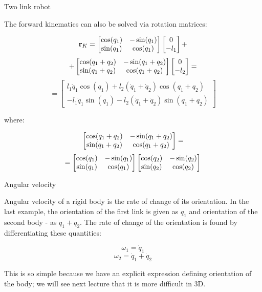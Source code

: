 \documentclass{beamer}
\begin{document}
\begin{frame}{Two link robot}
	\begin{flushleft}
		
		The forward kinematics can also be solved via rotation matrices:
		
		$$
			\mathbf{r}_K = 
			\begin{bmatrix} \cos(q_1) & -\sin (q_1) \\ \sin (q_1) & \cos(q_1) \end{bmatrix}
			\begin{bmatrix}
				0 \\ 
				-l_1 
			\end{bmatrix}
		+$$
		$$+
		\begin{bmatrix} \cos(q_1+q_2) & -\sin (q_1+q_2) \\ \sin (q_1+q_2) & \cos(q_1+q_2) \end{bmatrix}
		\begin{bmatrix}
			0 \\ 
			-l_2 
		\end{bmatrix}
			=$$
			$$
			=
			\begin{bmatrix}
				l_1 \dot q_1\cos (q_1) + l_2 (\dot q_1+\dot q_2) \cos (q_1+q_2) \\ 
				- l_1 \dot q_1\sin (q_1)  - l_2 (\dot q_1+\dot q_2) \sin (q_1+q_2) 
			\end{bmatrix}
		$$
		
		where:
		
		$$ \begin{bmatrix} \cos(q_1+q_2) & -\sin (q_1+q_2) \\ \sin (q_1+q_2) & \cos(q_1+q_2) \end{bmatrix}  =$$
		$$=
		\begin{bmatrix} \cos(q_1) & -\sin (q_1) \\ \sin (q_1) & \cos(q_1) \end{bmatrix}
		\begin{bmatrix} \cos(q_2) & -\sin (q_2) \\ \sin (q_2) & \cos(q_2) \end{bmatrix}
		$$ 
		
		
		
		
		
	\end{flushleft}
\end{frame}



\begin{frame}{Angular velocity}
	\begin{flushleft}
		
		Angular velocity of a rigid body is the rate of change of its orientation. In the last example, the orientation of the first link is given as $q_1$ and orientation of the second body - as $q_1 + q_2$. The rate of change of the orientation is found by differentiating these quantities:
		
		\begin{equation}
			\omega_1 = \dot q_1
		\end{equation}
		\begin{equation}
			\omega_2 = \dot q_1 + \dot q_2  
		\end{equation}
		
		This is so simple because we have an explicit expression defining orientation of the body; we will see next lecture that it is more difficult in 3D.
		
	\end{flushleft}
\end{frame}
\end{document}
